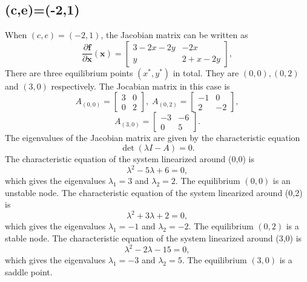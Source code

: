 \documentclass[a4paper,twocolumn]{article} %
\begin{document}
\subsection{(c,e)=(-2,1)}
When $(c,e)=(-2,1)$, the Jacobian matrix can be written as
\begin{equation*}
    \frac{\partial\textbf{f}}{\partial \textbf{x}}(\textbf{x}) =
    \left[\begin{array}{cc}
    3-2x-2y & -2x \\
    y & 2+x-2y
    \end{array}\right],
\end{equation*}
There are three equilibrium points $(x^*,y^*)$ in total. They are $(0,0),(0,2)$ and $(3,0)$ respectively. The Jocabian matrix in this case is
\begin{equation*}
    A_{(0,0)} =
    \left[\begin{array}{cc}
    3 & 0 \\
    0 & 2
    \end{array}\right], \; A_{(0,2)} =
    \left[\begin{array}{cc}
    -1 & 0 \\
    2 & -2
    \end{array}\right],   
    \end{equation*}
    \begin{equation*}
    A_{(3,0)} =
    \left[\begin{array}{cc}
    -3 & -6 \\
    0 & 5
    \end{array}\right].
\end{equation*}
The eigenvalues of the Jacobian matrix are given by the characteristic equation
\begin{equation*}
    \det(\lambda I - A) = 0.
\end{equation*}
The characteristic equation of the system linearized around \mbox{(0,0)} is
\begin{equation*}
    \lambda^2 -5 \lambda + 6 = 0,
\end{equation*}
which gives the eigenvalues $\lambda_{1} = 3$ and $\lambda_{2} = 2$. The equilibrium $(0,0)$ is an unstable node. 
The characteristic equation of the system linearized around \mbox{(0,2)} is
\begin{equation*}
    \lambda^2 +3 \lambda + 2 = 0,
\end{equation*}
which gives the eigenvalues $\lambda_1 = -1$ and $\lambda_2 = -2$. The equilibrium $(0,2)$ is a stable node. 
The characteristic equation of the system linearized around \mbox{(3,0)} is
\begin{equation*}
    \lambda^2 -2 \lambda - 15 = 0,
\end{equation*}
which gives the eigenvalues $\lambda_1 = -3$ and $\lambda_2 = 5$. The equilibrium $(3,0)$ is a saddle point.
\end{document}
